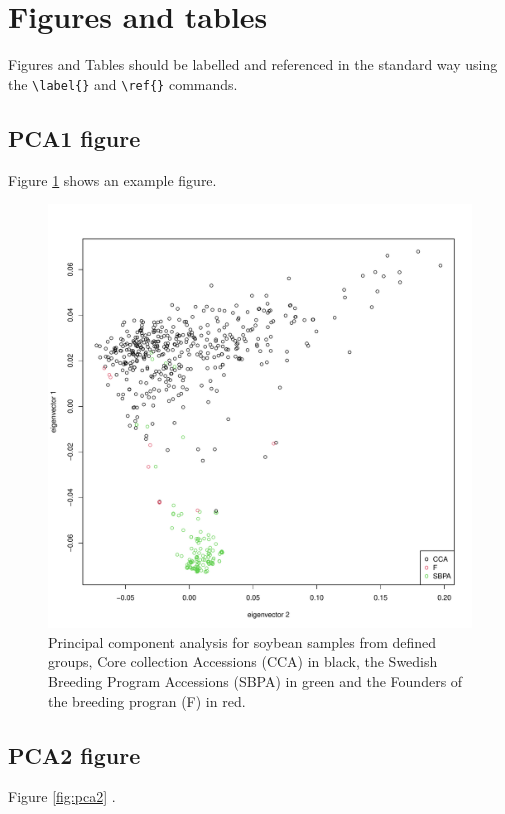 \documentclass[9pt, onecolumn,twoside]{gsajnl}
\begin{document}
\section{Figures and tables}

Figures and Tables should be labelled and referenced in the standard way using the \verb|\label{}| and \verb|\ref{}| commands.

\subsection{PCA1 figure}

Figure \ref{fig:pca} shows an example figure.

\begin{figure}[t]
\centering
\includegraphics[width=\linewidth]{plot_PCA_origin.pdf}
\caption{Principal component analysis for soybean samples from defined groups, Core collection Accessions (CCA) in black, the Swedish Breeding Program Accessions (SBPA) in green and the Founders of the breeding progran (F) in red.}%
\label{fig:pca}
\end{figure}
\subsection{PCA2 figure}


Figure \ref{fig:pca2} .
\end{document}
